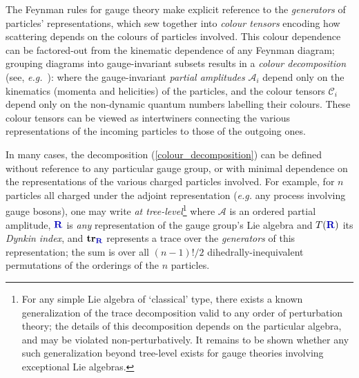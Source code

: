 \documentclass[12pt,a4paper]{article}\let\ifpdf\relax
\begin{document}
The Feynman rules for gauge theory make explicit reference to the \emph{generators} of particles' representations, which sew together into \emph{colour tensors} encoding how scattering depends on the colours of particles involved. This colour dependence can be factored-out from the kinematic dependence of any Feynman diagram; grouping diagrams into gauge-invariant subsets \cite{Cvitanovic:1976am} results in a \emph{colour decomposition} (see, \emph{e.g.}~\cite{Mangano:1988kk,Mangano:1990by,Dixon:1996wi,DelDuca:1999rs,Dixon:2013uaa,Melia:2015ika,Johansson:2015oia}):
%
\vspace{-1pt}
%
where the gauge-invariant \emph{partial amplitudes} $\mathcal{A}_i$ depend only on the kinematics (momenta and helicities) of the particles, and the colour tensors $\mathcal{C}_i$ depend only on the non-dynamic quantum numbers labelling their colours. These colour tensors can be viewed as intertwiners connecting the various representations of the incoming particles to those of the outgoing ones. 


In many cases, the decomposition (\ref{colour_decomposition}) can be defined without reference to any particular gauge group, or with minimal dependence on the representations of the various charged particles involved. For example, for $n$ particles all charged under the adjoint representation (\emph{e.g.} any process involving gauge bosons), one may write \emph{at tree-level}\footnote{For any simple Lie algebra of `classical' type, there exists a known generalization of the trace decomposition valid to any order of perturbation theory; the details of this decomposition depends on the particular algebra, and may be violated non-perturbatively. It remains to be shown whether any such generalization beyond tree-level exists for gauge theories involving exceptional Lie algebras.}
%
\vspace{-0pt}
%
where $\mathcal{A}$ is an ordered partial amplitude, $\mathbf{\b{R}}$ is \emph{any} representation of the gauge group's Lie algebra and $T(\mathbf{\b{R}})$ its \emph{Dynkin index}, and $\mathbf{tr}_{\mathbf{\b{R}}}$ represents a trace over the \emph{generators} of this representation; the sum is over all $(n{-}1)!/2$ dihedrally-inequivalent permutations of the orderings of the $n$ particles.%
\end{document}
